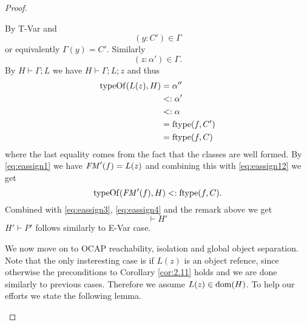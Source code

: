 \begin{proof}
\begin{description}
\begin{description}
\begin{description}
              By {\sc T-Var} and 
              \begin{equation}\label{eq:eassign10}
                (y: C') \in \Gamma 
              \end{equation}
              or equivalently $\Gamma(y) = C'$.
              Similarly
              \begin{equation} \label{eq:eassign11}
                (z: \alpha') \in \Gamma.
              \end{equation}
              By $H \vdash \Gamma; L$ we have $H \vdash \Gamma; L; z$ and thus
              \begin{equation} \label{eq:eassign12}
                \begin{aligned}
                  \mbox{$\mathrm{typeOf}$}(L(z), H) &= \alpha'' \\ 
                                   &<: \alpha' \\ 
                                   &<: \alpha \\ 
                                   &= \mbox{$\mathrm{ftype}$}(f, C') \\ 
                                   &= \mbox{$\mathrm{ftype}$}(f, C)
                \end{aligned}
              \end{equation}
              where the last equality comes from the fact that the classes are
              well formed. By \eqref{eq:eassign1} we have $\mathit{FM}'(f) = L(z)$ and
              combining this with \eqref{eq:eassign12} we get
              \begin{equation} \label{eq:eassign13}
                \mbox{$\mathrm{typeOf}$}(\mathit{FM}'(f), H) <: \mbox{$\mathrm{ftype}$}(f, C).
              \end{equation}
              Combined with \eqref{eq:eassign3}, \eqref{eq:eassign4} and the
              remark above we get
              \begin{equation*} 
                \vdash H'
              \end{equation*}
              $H' \vdash P'$ follows similarly to {\sc E-Var} case.

              We now move on to OCAP reachability, isolation and global object
              separation.  Note that the only insteresting case is if $L(z)$ is
              an object refence, since otherwise the preconditions to Corollary
              \ref{cor:2.11} holds and we are done similarly to previous cases.
              Therefore we assume $L(z) \in \mbox{$\mathrm{dom}$}(H)$.  To help our efforts we
              state the following lemma.


\end{description}
\end{description}
\end{description}
\end{proof}
